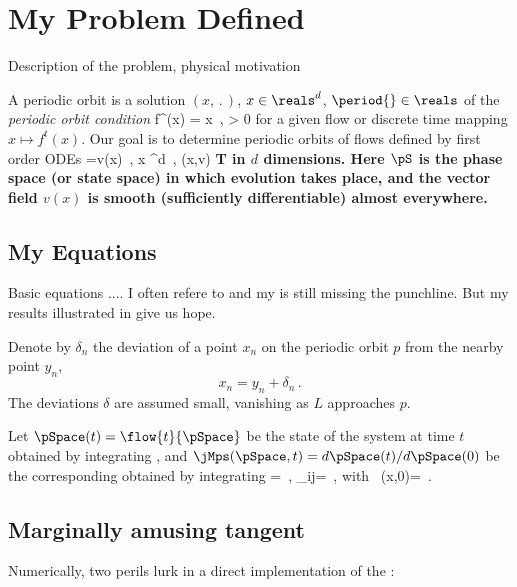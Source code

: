\documentclass[pre,twocolumn,groupedaddress,showpacs,showkeys]{revtex4}
\begin{document}
\section{My Problem Defined}
\label{sec:der}

	Description of the problem, physical motivation

    
A periodic orbit is a
solution $(x,\period{})$, $x \in \reals^{d}$,
$\period{} \in \reals$ of the {\em periodic orbit condition}
\beq
f^{\period{}}(x) = x
\,,\qquad \period{} > 0
\label{e:periodic}
\eeq
for a given flow or discrete time mapping $x \mapsto f^t({x})$.
Our goal is to determine periodic 
orbits of flows defined by first order ODEs
\beq
{}=v(x)
	\,,\qquad
 x \in \pS \subset {}^d
	\,,\qquad 
 (x,v) \in \bf{T}\pS  
\label{fl}
\eeq
in $d$ dimensions. Here $\pS$ is the phase space 
(or state space) in which evolution takes place, 
and the vector field $v(x)$ is smooth (sufficiently 
differentiable) almost everywhere.


\subsection{My Equations}
\label{sec:eqs}

	Basic equations .... I often refere to
and my  is still missing the punchline.
But my results illustrated in 
give us hope.

Denote by $\delta_n$ the deviation of a point $x_n$ on the 
periodic orbit $p$ from the nearby point $y_n$, 
\[
x_n  =y_n+\delta_n
\,.
\] 
The deviations $\delta $ are assumed small, vanishing as
$L$ approaches $p$.

Let 
$ \pSpace(t) = \flow{t}{\pSpace} $
be the state of the system at time $t$ obtained by
integrating , and 
$\jMps(\pSpace,t) = d \pSpace(t)/d \pSpace(0)$ be
the corresponding {} obtained by integrating
\beq
{} = \Mvar \jMps
\,,\quad
\Mvar_{ij}=
\,,\qquad
\mbox{with } \jMps(x,0)= 
\,. 
\label{doa}
\eeq


\subsection{Marginally amusing tangent}
\label{sect:marg}

Numerically, two perils lurk in a direct implementation of the {} 
: 
\end{document}
